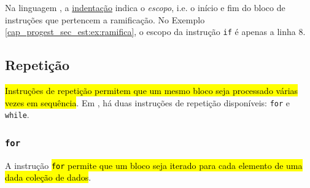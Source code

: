 \begin{obs}
  Na linguagem {\python}, a \href{https://pt.wikipedia.org/wiki/Indenta\%C3\%A7\%C3\%A3o}{indentação} indica o \emph{escopo}, i.e. o início e fim do bloco de instruções que pertencem a ramificação. No Exemplo \ref{cap_progest_sec_est:ex:ramifica}, o escopo da instrução \lstinline+if+ é apenas a linha 8.
\end{obs}

\subsection{Repetição}

\hl{Instruções de repetição permitem que um mesmo bloco seja processado várias vezes em sequência}. Em {\python}, há duas instruções de repetição disponíveis: \lstinline+for+ e \lstinline+while+. 

\subsubsection{\lstinline+for+}

A instrução \hl{\texttt{for} permite que um bloco seja iterado para cada elemento de uma dada coleção de dados}.

